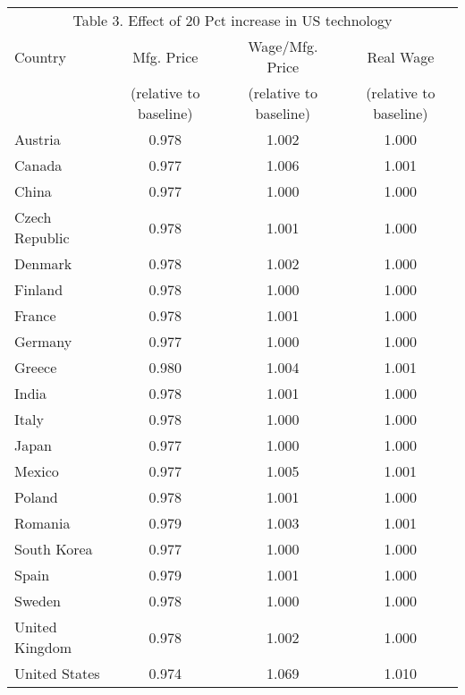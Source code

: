 \begin{tabular}{lccc} \hline
 \multicolumn{4}{c}{Table 3. Effect of 20 Pct increase in US technology} \\ \cline{1-4}
 Country & Mfg. Price & Wage/Mfg. Price & Real Wage \\
  & (relative to baseline) & (relative to baseline)  & (relative to baseline) \\ \hline
Austria&0.978&1.002&1.000\\
Canada&0.977&1.006&1.001\\
China&0.977&1.000&1.000\\
Czech Republic&0.978&1.001&1.000\\
Denmark&0.978&1.002&1.000\\
Finland&0.978&1.000&1.000\\
France&0.978&1.001&1.000\\
Germany&0.977&1.000&1.000\\
Greece&0.980&1.004&1.001\\
India&0.978&1.001&1.000\\
Italy&0.978&1.000&1.000\\
Japan&0.977&1.000&1.000\\
Mexico&0.977&1.005&1.001\\
Poland&0.978&1.001&1.000\\
Romania&0.979&1.003&1.001\\
South Korea&0.977&1.000&1.000\\
Spain&0.979&1.001&1.000\\
Sweden&0.978&1.000&1.000\\
United Kingdom&0.978&1.002&1.000\\
United States&0.974&1.069&1.010\\
\hline \end{tabular}
